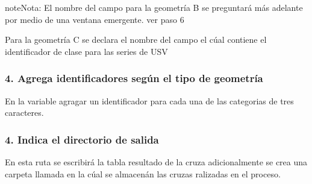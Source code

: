 \documentclass[letterpaper,10pt,spanish]{sphinxmanual}
\begin{document}
\begin{sphinxadmonition}{note}{Nota:}
El nombre del campo para la geometría B se preguntará más adelante
por medio de una ventana emergente. ver paso 6
\end{sphinxadmonition}

Para la geometría C se declara el nombre del campo el cúal contiene el identificador
de clase para las series de USV

\begin{sphinxVerbatim}[commandchars=\\\{\}]
  
\end{sphinxVerbatim}


\subsubsection{4. Agrega identificadores según el tipo de geometría}
\label{\detokenize{tabulacion_3geo:agrega-identificadores-segun-el-tipo-de-geometria}}
En la variable  agragar un identificador  para cada una de las
categorias de tres caracteres.

\begin{sphinxVerbatim}[commandchars=\\\{\}]
\PYG{p}{[}\PYG{p}{]}
\end{sphinxVerbatim}


\subsubsection{4. Indica el directorio de salida}
\label{\detokenize{tabulacion_3geo:indica-el-directorio-de-salida}}
En esta ruta se escribirá la tabla resultado de la cruza adicionalmente se  crea una carpeta llamada  en la cúal se almacenán
las cruzas ralizadas en el proceso.

\begin{sphinxVerbatim}[commandchars=\\\{\}]
  
\end{sphinxVerbatim}
\end{document}
